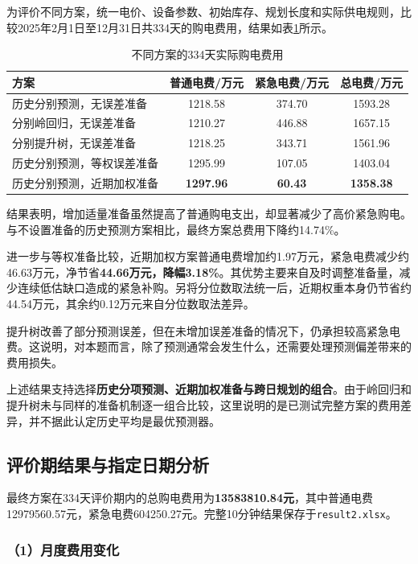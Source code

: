 为评价不同方案，统一电价、设备参数、初始库存、规划长度和实际供电规则，比较2025年2月1日至12月31日共334天的购电费用，结果如表\ref{tab:q2_model_compare}所示。

\begin{table}[htbp]
\centering
\caption{不同方案的334天实际购电费用}
\label{tab:q2_model_compare}
\begin{tabular}{lccc}
\hline
方案 & 普通电费/万元 & 紧急电费/万元 & 总电费/万元 \\
\hline
历史分别预测，无误差准备
& 1218.58 & 374.70 & 1593.28 \\
分别岭回归，无误差准备
& 1210.27 & 446.88 & 1657.15 \\
分别提升树，无误差准备
& 1218.25 & 343.71 & 1561.96 \\
历史分别预测，等权误差准备
& 1295.99 & 107.05 & 1403.04 \\
历史分别预测，近期加权准备
& \textbf{1297.96} & \textbf{60.43} & \textbf{1358.38} \\
\hline
\end{tabular}
\end{table}

结果表明，增加适量准备虽然提高了普通购电支出，却显著减少了高价紧急购电。与不设置准备的历史预测方案相比，最终方案总费用下降约14.74\%。

进一步与等权准备比较，近期加权方案普通电费增加约1.97万元，紧急电费减少约46.63万元，净节省\textbf{44.66万元，降幅3.18\%}。其优势主要来自及时调整准备量，减少连续低估缺口造成的紧急补购。另将分位数取法统一后，近期权重本身仍节省约44.54万元，其余约0.12万元来自分位数取法差异。

提升树改善了部分预测误差，但在未增加误差准备的情况下，仍承担较高紧急电费。这说明，对本题而言，除了预测通常会发生什么，还需要处理预测偏差带来的费用损失。

上述结果支持选择\textbf{历史分项预测、近期加权准备与跨日规划的组合}。由于岭回归和提升树未与同样的准备机制逐一组合比较，这里说明的是已测试完整方案的费用差异，并不据此认定历史平均是最优预测器。

\subsection{评价期结果与指定日期分析}

最终方案在334天评价期内的总购电费用为\textbf{13583810.84元}，其中普通电费12979560.57元，紧急电费604250.27元。完整10分钟结果保存于\texttt{result2.xlsx}。

\subsubsection*{（1）月度费用变化}


